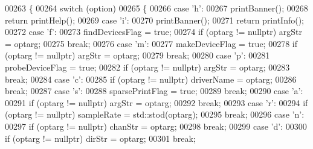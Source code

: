 \begin{DoxyCode}
00263     \{
00264         \textcolor{keywordflow}{switch} (option)
00265         \{
00266         \textcolor{keywordflow}{case} \textcolor{charliteral}{'h'}:
00267             printBanner();
00268             \textcolor{keywordflow}{return} printHelp();
00269         \textcolor{keywordflow}{case} \textcolor{charliteral}{'i'}:
00270             printBanner();
00271             \textcolor{keywordflow}{return} printInfo();
00272         \textcolor{keywordflow}{case} \textcolor{charliteral}{'f'}:
00273             findDevicesFlag = \textcolor{keyword}{true};
00274             \textcolor{keywordflow}{if} (optarg != \textcolor{keyword}{nullptr}) argStr = optarg;
00275             \textcolor{keywordflow}{break};
00276         \textcolor{keywordflow}{case} \textcolor{charliteral}{'m'}:
00277             makeDeviceFlag = \textcolor{keyword}{true};
00278             \textcolor{keywordflow}{if} (optarg != \textcolor{keyword}{nullptr}) argStr = optarg;
00279             \textcolor{keywordflow}{break};
00280         \textcolor{keywordflow}{case} \textcolor{charliteral}{'p'}:
00281             probeDeviceFlag = \textcolor{keyword}{true};
00282             \textcolor{keywordflow}{if} (optarg != \textcolor{keyword}{nullptr}) argStr = optarg;
00283             \textcolor{keywordflow}{break};
00284         \textcolor{keywordflow}{case} \textcolor{charliteral}{'c'}:
00285             \textcolor{keywordflow}{if} (optarg != \textcolor{keyword}{nullptr}) driverName = optarg;
00286             \textcolor{keywordflow}{break};
00287         \textcolor{keywordflow}{case} \textcolor{charliteral}{'s'}:
00288             sparsePrintFlag = \textcolor{keyword}{true};
00289             \textcolor{keywordflow}{break};
00290         \textcolor{keywordflow}{case} \textcolor{charliteral}{'a'}:
00291             \textcolor{keywordflow}{if} (optarg != \textcolor{keyword}{nullptr}) argStr = optarg;
00292             \textcolor{keywordflow}{break};
00293         \textcolor{keywordflow}{case} \textcolor{charliteral}{'r'}:
00294             \textcolor{keywordflow}{if} (optarg != \textcolor{keyword}{nullptr}) sampleRate = std::stod(optarg);
00295             \textcolor{keywordflow}{break};
00296         \textcolor{keywordflow}{case} \textcolor{charliteral}{'n'}:
00297             \textcolor{keywordflow}{if} (optarg != \textcolor{keyword}{nullptr}) chanStr = optarg;
00298             \textcolor{keywordflow}{break};
00299         \textcolor{keywordflow}{case} \textcolor{charliteral}{'d'}:
00300             \textcolor{keywordflow}{if} (optarg != \textcolor{keyword}{nullptr}) dirStr = optarg;
00301             \textcolor{keywordflow}{break};

\end{DoxyCode}
